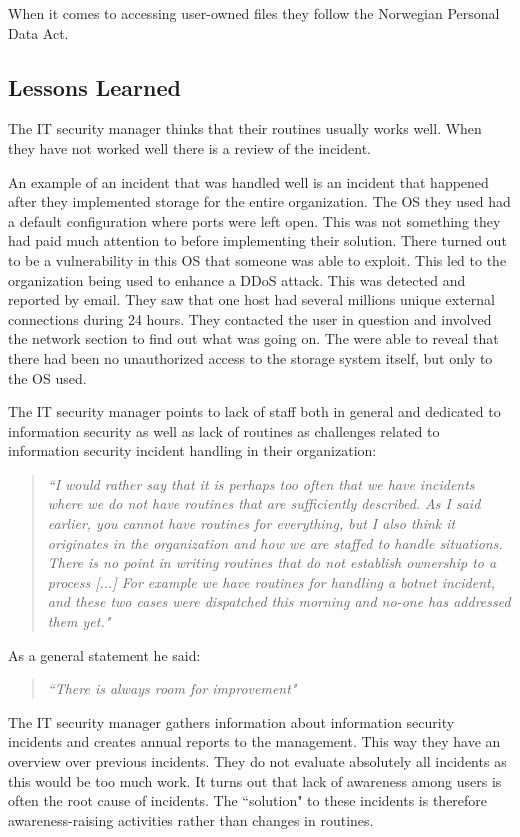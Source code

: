 When it comes to accessing user-owned files they follow the Norwegian Personal Data Act.

\subsection{Lessons Learned}
The IT security manager thinks that their routines usually works well. When they have not worked well there is a review of the incident.

An example of an incident that was handled well is an incident that happened after they implemented storage for the entire organization. The OS they used had a default configuration where ports were left open. This was not something they had paid much attention to before implementing their solution. There turned out to be a vulnerability in this OS that someone was able to exploit. This led to the organization being used to enhance a \ac{DDoS} attack. This was detected and reported by email. They saw that one host had several millions unique external connections during 24 hours. They contacted the user in question  and involved the network section to find out what was going on. The were able to reveal that there had been no unauthorized access to the storage system itself, but only to the OS used.

The IT security manager points to lack of staff  both in general and dedicated to information security as well as lack of routines as challenges related to information security incident handling in their organization: 

\begin{quote}
\textit{``I would rather say that it is perhaps too often that we have incidents where we do not have routines that are sufficiently described. %
As I said earlier, you cannot have routines for everything, but I also think it originates in the organization and how we are staffed to handle situations. There is no point in writing routines that do not establish ownership to a process [...] For example we have routines for handling a botnet incident, and these two cases were dispatched this morning and no-one has addressed them yet."}
\end{quote}

As a general statement he said: 

\begin{quote}
\textit{``There is always room for improvement"}
\end{quote}

The IT security manager gathers information about information security incidents and creates annual reports to the management. This way they have an overview over previous incidents. They do not evaluate absolutely all incidents as this would be too much work. It turns out that lack of awareness among users is often the root cause of incidents. The ``solution" to these incidents is therefore awareness-raising activities rather than changes in routines.


